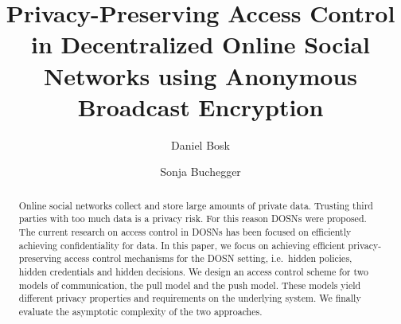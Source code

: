\title{%
  Privacy-Preserving Access Control in
  Decentralized Online Social Networks using
  Anonymous Broadcast Encryption
}
\author{%
  Daniel Bosk \and
  Sonja Buchegger
}


\mode* %

\begin{abstract}
  Online social networks collect and store large amounts of private data.
  Trusting third parties with too much data is a privacy risk.
  For this reason \acp{DOSN} were proposed.
  The current research on access control in \acp{DOSN} has been focused on 
  efficiently achieving confidentiality for data.
  In this paper, we focus on achieving efficient privacy-preserving access 
  control mechanisms for the \ac{DOSN} setting, i.e.~hidden policies, hidden 
  credentials and hidden decisions.
  We design an access control scheme for two models of communication, the pull 
  model and the push model.
  These models yield different privacy properties and requirements on the 
  underlying system.
  We finally evaluate the asymptotic complexity of the two approaches.

\end{abstract}


